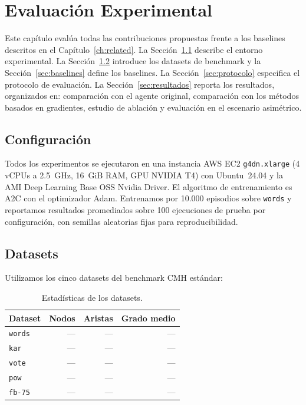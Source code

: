 \documentclass[11pt,a4paper,twoside]{tesis}
\begin{document}
\chapter{Evaluación Experimental}
\label{ch:experiments}

Este capítulo evalúa todas las contribuciones propuestas frente a los baselines
descritos en el Capítulo~\ref{ch:related}. La Sección~\ref{sec:config} describe el
entorno experimental. La Sección~\ref{sec:datasets} introduce los datasets de benchmark
y la Sección~\ref{sec:baselines} define los baselines. La Sección~\ref{sec:protocolo}
especifica el protocolo de evaluación. La Sección~\ref{sec:resultados} reporta los
resultados, organizados en: comparación con el agente original, comparación con los
métodos basados en gradientes, estudio de ablación y evaluación en el escenario
asimétrico.

\section{Configuración}
\label{sec:config}

Todos los experimentos se ejecutaron en una instancia AWS EC2 \texttt{g4dn.xlarge}
(4 vCPUs a 2.5~GHz, 16~GiB RAM, GPU NVIDIA T4) con Ubuntu~24.04 y la AMI Deep Learning
Base OSS Nvidia Driver. El algoritmo de entrenamiento es A2C con el optimizador Adam.
Entrenamos por 10.000 episodios sobre \texttt{words} y reportamos resultados promediados
sobre 100 ejecuciones de prueba por configuración, con semillas aleatorias fijas para
reproducibilidad.

\section{Datasets}
\label{sec:datasets}

Utilizamos los cinco datasets del benchmark CMH estándar:

\begin{table}[h]
\centering
\caption{Estadísticas de los datasets.}
\label{tab:datasets}
\begin{tabular}{lrrr}
\toprule
Dataset   & Nodos & Aristas & Grado medio \\
\midrule
\texttt{words}  & --- & --- & --- \\
\texttt{kar}    & --- & --- & --- \\
\texttt{vote}   & --- & --- & --- \\
\texttt{pow}    & --- & --- & --- \\
\texttt{fb-75}  & --- & --- & --- \\
\bottomrule
\end{tabular}
\end{table}
\end{document}
